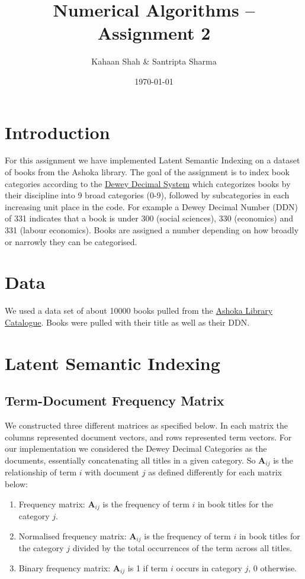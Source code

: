 \documentclass[article]{article}
\title{Numerical Algorithms – Assignment 2}
\author{Kahaan Shah \& Santripta Sharma}
\date{\today}
\begin{document}
\maketitle

\section{Introduction}
For this assignment we have implemented Latent Semantic Indexing on a dataset of books from the Ashoka library. The goal of the assignment is to index book categories according to the \href{https://en.wikipedia.org/wiki/Dewey_Decimal_Classification}{Dewey Decimal System} which categorizes books by their discipline into 9 broad categories (0-9), followed by subcategories in each increasing unit place in the code. For example a Dewey Decimal Number (DDN) of 331 indicates that a book is under 300 (social sciences), 330 (economics) and 331 (labour economics). Books are assigned a number depending on how broadly or narrowly they can be categorised. 

\section{Data}
We used a data set of about 10000 books pulled from the \href{https://koha.ashoka.edu.in}{Ashoka Library Catalogue}. Books were pulled with their title as well as their DDN.

\section{Latent Semantic Indexing}

\subsection{Term-Document Frequency Matrix}

We constructed three different matrices as specified below. In each matrix the columns represented document vectors, and rows represented term vectors. For our implementation we considered the Dewey Decimal Categories as the documents, essentially concatenating all titles in a given category. So $\mathbf{A}_{ij}$ is the relationship of term $i$ with document $j$ as defined differently for each matrix below:

\begin{enumerate}
    \item Frequency matrix: $\textbf{A}_{ij}$ is the frequency of term $i$ in book titles for the category $j$. 
    \item Normalised frequency matrix: $\textbf{A}_{ij}$ is the frequency of term $i$ in book titles for the category $j$ divided by the total occurrences of the term across all titles. 
    \item Binary frequency matrix: $\textbf{A}_{ij}$ is 1 if term $i$ occurs in category $j$, 0 otherwise.
\end{enumerate}
\end{document}
